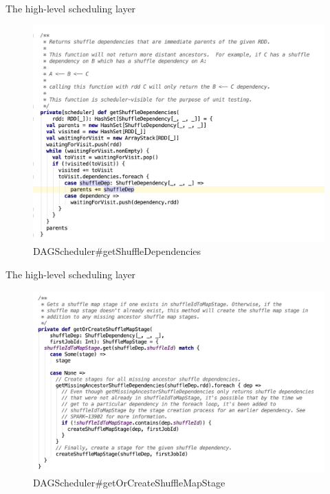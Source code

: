 \begin{frame}[plain,t]{The high-level scheduling layer} %
	 \\  
	\begin{figure}
		\centering
		\includegraphics[width=0.9\linewidth]{images/dag009}
		\caption{DAGScheduler\#getShuffleDependencies}
		\label{fig:dag009}
	\end{figure}
	
	
\end{frame}
\begin{frame}[plain,t]{The high-level scheduling layer} %
	 \\  
	\begin{figure}
		\centering
		\includegraphics[width=0.9\linewidth]{images/dag010}
		\caption{DAGScheduler\#getOrCreateShuffleMapStage}
		\label{fig:dag010}
	\end{figure}
	
	
\end{frame}
